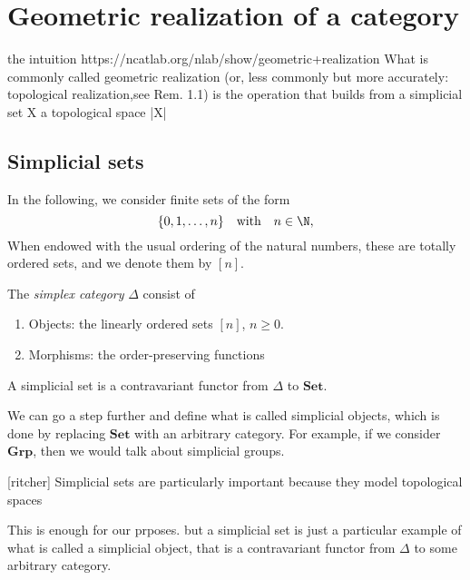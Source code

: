 \chapter{Geometric realization of a category}

the intuition 
https://ncatlab.org/nlab/show/geometric+realization  What is commonly called geometric realization (or, less commonly but more accurately: topological realization,see Rem. 1.1) is the operation that builds from a simplicial set X a topological space |X|

\section{Simplicial sets}


In the following, we consider finite sets of the form \[\{0,1,\dots,n\}\quad\text{with}\quad n\in\N,\] 
When  endowed with the usual ordering of the natural numbers, these are totally ordered sets, and we denote them  by \([n]\). %


\begin{definition}
    The \textit{simplex category} \(\Delta\) consist of \begin{enumerate}[label=(\roman*)]
        \item Objects: the linearly ordered sets \([n]\), \(n\geq 0\).
        \item Morphisms: the order-preserving functions
    \end{enumerate}
\end{definition}


\begin{definition}
    A simplicial set is a contravariant functor from \(\Delta\) to \(\mathbf{Set}\).
    
\end{definition}


We can go a step further and define what is called simplicial objects, which is done by replacing \(\mathbf{Set}\) with an arbitrary category. 
For example, if we consider \(\mathbf{Grp}\), then we would talk about simplicial groups.

[ritcher] Simplicial sets are particularly important because they model topological spaces

This is enough for our prposes.
but
a simplicial set is just a particular example of what is called a simplicial object, that is a contravariant functor from \(\Delta\) to some arbitrary category.

